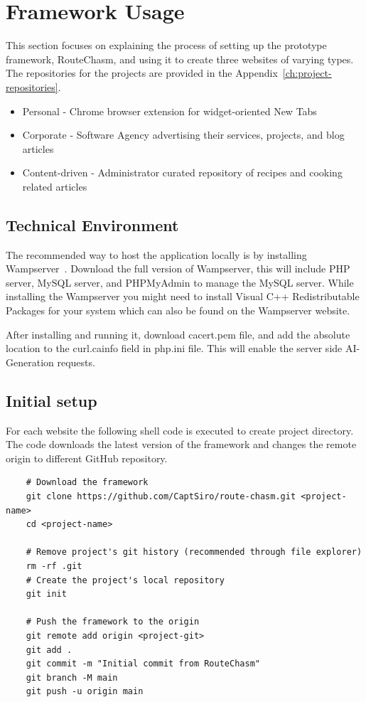\chapter{Framework Usage}\label{ch:frameworkUsage}
This section focuses on explaining the process of setting up the prototype framework, RouteChasm, and using it to create
three websites of varying types.
The repositories for the projects are provided in the Appendix~\ref{ch:project-repositories}.

\begin{itemize}
    \item Personal - Chrome browser extension for widget-oriented New Tabs
    \item Corporate - Software Agency advertising their services, projects, and blog articles
    \item Content-driven - Administrator curated repository of recipes and cooking related articles
\end{itemize}

\section{Technical Environment}\label{sec:technicalEnvironment}
The recommended way to host the application locally is by installing Wampserver~\parencite{wampserver}.
Download the full version of Wampserver, this will include PHP server, MySQL server, and PHPMyAdmin to manage the MySQL server.
While installing the Wampserver you might need to install Visual C++ Redistributable Packages for your system which can
also be found on the Wampserver website.

After installing and running it, download cacert.pem file, and add the absolute location to the curl.cainfo field
in php.ini file.
This will enable the server side AI-Generation requests.

\section{Initial setup}\label{sec:initialSetup}
For each website the following shell code is executed to create project directory.
The code downloads the latest version of the framework and changes the remote origin to different GitHub repository.

\begin{verbatim}
    # Download the framework
    git clone https://github.com/CaptSiro/route-chasm.git <project-name>
    cd <project-name>

    # Remove project's git history (recommended through file explorer)
    rm -rf .git
    # Create the project's local repository
    git init

    # Push the framework to the origin
    git remote add origin <project-git>
    git add .
    git commit -m "Initial commit from RouteChasm"
    git branch -M main
    git push -u origin main
\end{verbatim}

